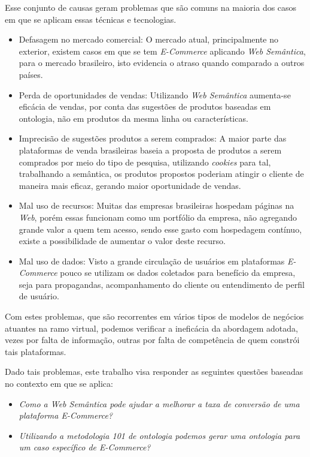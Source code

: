 Esse conjunto de causas geram problemas que são comuns na maioria dos casos em que se aplicam essas técnicas e tecnologias.

\begin{itemize}
\item Defasagem no mercado comercial: O mercado atual, principalmente no exterior, existem casos em que se tem \textit{E-Commerce} aplicando \textit{Web Semântica}, para o mercado brasileiro, isto evidencia o atraso quando comparado a outros países.
\item Perda de oportunidades de vendas: Utilizando \textit{Web Semântica} aumenta-se eficácia de vendas, por conta das sugestões de produtos baseadas em ontologia, não em produtos da mesma linha ou características.
\item Imprecisão de sugestões produtos a serem comprados: A maior parte das plataformas de venda brasileiras baseia a proposta de produtos a serem comprados por meio do tipo de pesquisa, utilizando \textit{cookies} para tal, trabalhando a semântica, os produtos propostos poderiam atingir o cliente de maneira mais eficaz, gerando maior oportunidade de vendas.
\item Mal uso de recursos: Muitas das empresas brasileiras hospedam páginas na \textit{Web}, porém essas funcionam como um portfólio da empresa, não agregando grande valor a quem tem acesso, sendo esse gasto com hospedagem contínuo, existe a possibilidade de aumentar o valor deste recurso.
\item Mal uso de dados: Visto a grande circulação de usuários em plataformas \textit{E-Commerce} pouco se utilizam os dados coletados para benefício da empresa, seja para propagandas, acompanhamento do cliente ou entendimento de perfil de usuário.
\end{itemize}

Com estes problemas, que são recorrentes em vários tipos de modelos de negócios atuantes na ramo virtual, podemos verificar a ineficácia da abordagem adotada, vezes por falta de informação, outras por falta de competência de quem constrói tais plataformas.

	Dado tais problemas, este trabalho visa responder as seguintes questões baseadas no contexto em que se aplica:

	\begin{itemize}
	\item{\textit{Como a Web Semântica pode ajudar a melhorar a taxa de conversão de uma plataforma E-Commerce?}}
	\item{\textit{Utilizando a metodologia 101 de ontologia podemos gerar uma ontologia para um caso específico de E-Commerce?}}
	\end{itemize}

